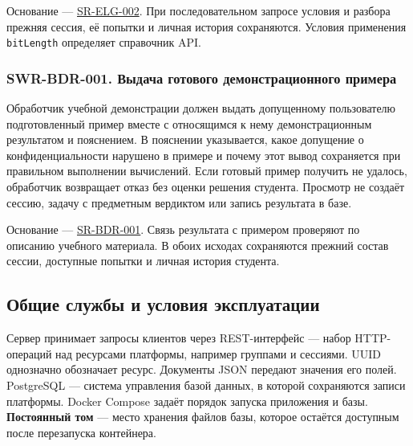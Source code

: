 \documentclass[12pt,a4paper]{article}
\begin{document}
Основание --- {\href{../04\_Системные\_требования/DOC-05\_Системные\_требования.pdf\#sr-elg-002}{SR-ELG-002}}. При последовательном запросе условия и разбора прежняя сессия, её попытки и личная история сохраняются. Условия применения \texttt{bitLength} определяет справочник API.

\subsubsection{SWR-BDR-001. Выдача готового демонстрационного примера}\label{swr-bdr-001-ux432ux44bux434ux430ux447ux430-ux433ux43eux442ux43eux432ux43eux433ux43e-ux434ux435ux43cux43eux43dux441ux442ux440ux430ux446ux438ux43eux43dux43dux43eux433ux43e-ux43fux440ux438ux43cux435ux440ux430}

\hypertarget{swr-bdr-001-выдача-готового-демонстрационного-примера}{}

\hypertarget{swr-bdr-001}{}

Обработчик учебной демонстрации должен выдать допущенному пользователю подготовленный пример вместе с относящимся к нему демонстрационным результатом и пояснением. В пояснении указывается, какое допущение о конфиденциальности нарушено в примере и почему этот вывод сохраняется при правильном выполнении вычислений. Если готовый пример получить не удалось, обработчик возвращает отказ без оценки решения студента. Просмотр не создаёт сессию, задачу с предметным вердиктом или запись результата в базе.

Основание --- {\href{../04\_Системные\_требования/DOC-05\_Системные\_требования.pdf\#sr-bdr-001}{SR-BDR-001}}. Связь результата с примером проверяют по описанию учебного материала. В обоих исходах сохраняются прежний состав сессии, доступные попытки и личная история студента.

\subsection{Общие службы и условия эксплуатации}\label{ux43eux431ux449ux438ux435-ux441ux43bux443ux436ux431ux44b-ux438-ux443ux441ux43bux43eux432ux438ux44f-ux44dux43aux441ux43fux43bux443ux430ux442ux430ux446ux438ux438}

\hypertarget{общие-службы-и-условия-эксплуатации}{}

Сервер принимает запросы клиентов через REST-интерфейс --- набор HTTP-операций над ресурсами платформы, например группами и сессиями. UUID однозначно обозначает ресурс. Документы JSON передают значения его полей. PostgreSQL --- система управления базой данных, в которой сохраняются записи платформы. Docker Compose задаёт порядок запуска приложения и базы. \textbf{Постоянный том} --- место хранения файлов базы, которое остаётся доступным после перезапуска контейнера.
\end{document}
